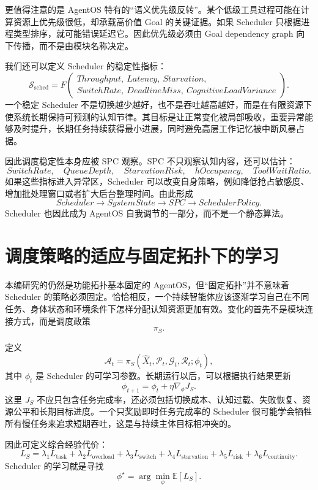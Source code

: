 更值得注意的是 AgentOS 特有的“语义优先级反转”。某个低级工具过程可能在计算资源上优先级很低，却承载高价值 Goal 的关键证据。如果 Scheduler 只根据进程类型排序，就可能错误延迟它。因此优先级必须由 Goal dependency graph 向下传播，而不是由模块名称决定。

我们还可以定义 Scheduler 的稳定性指标：
\[
\mathcal S_{\mathrm{sched}}
=
F\!\left(
\begin{gathered}
Throughput,\ Latency,\ Starvation,\\
SwitchRate,\ DeadlineMiss,\ CognitiveLoadVariance
\end{gathered}
\right).
\]
一个稳定 Scheduler 不是切换越少越好，也不是吞吐越高越好，而是在有限资源下使系统长期保持可预测的认知节律。其目标是让正常变化被局部吸收，重要异常能够及时提升，长期任务持续获得最小进展，同时避免高层工作记忆被中断风暴占据。

因此调度稳定性本身应被 SPC 观察。SPC 不只观察认知内容，还可以估计：
\[
SwitchRate,\quad
QueueDepth,\quad
StarvationRisk,\quad
hOccupancy,\quad
ToolWaitRatio.
\]
如果这些指标进入异常区，Scheduler 可以改变自身策略，例如降低抢占敏感度、增加批处理窗口或者扩大后台整理时间。由此形成
\[
Scheduler
\rightarrow
SystemState
\rightarrow
SPC
\rightarrow
SchedulerPolicy.
\]
Scheduler 也因此成为 AgentOS 自我调节的一部分，而不是一个静态算法。

\section{调度策略的适应与固定拓扑下的学习}

本编研究的仍然是功能拓扑基本固定的 AgentOS，但“固定拓扑”并不意味着 Scheduler 的策略必须固定。恰恰相反，一个持续智能体应该逐渐学习自己在不同任务、身体状态和环境条件下怎样分配认知资源更加有效。变化的首先不是模块连接方式，而是调度政策
\[
\pi_S.
\]

定义
\[
\mathcal A_t
=
\pi_S(
\widehat X_t,
\mathcal P_t,
\mathcal G_t,
\mathcal R_t;
\phi_t
),
\]
其中 $\phi_t$ 是 Scheduler 的可学习参数。长期运行以后，可以根据执行结果更新
\[
\phi_{t+1}
=
\phi_t
+
\eta
\nabla_\phi J_S.
\]
这里 $J_S$ 不应只包含任务完成率，还必须包括切换成本、认知过载、失败恢复、资源公平和长期目标进度。一个只奖励即时任务完成率的 Scheduler 很可能学会牺牲所有慢任务来追求短期吞吐，这是与持续主体目标相冲突的。

因此可定义综合经验代价：
\[
L_S
=
\lambda_1 L_{\mathrm{task}}
+
\lambda_2 L_{\mathrm{overload}}
+
\lambda_3 L_{\mathrm{switch}}
+
\lambda_4 L_{\mathrm{starvation}}
+
\lambda_5 L_{\mathrm{risk}}
+
\lambda_6 L_{\mathrm{continuity}}.
\]
Scheduler 的学习就是寻找
\[
\phi^\star
=
\arg\min_\phi
\mathbb E[L_S].
\]

